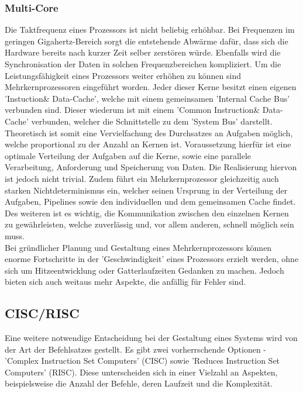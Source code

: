 \subsubsection{Multi-Core}
Die Taktfrequenz eines Prozessors ist nicht beliebig erhöhbar. Bei Frequenzen im geringen Gigahertz-Bereich sorgt die entstehende Abwärme dafür, dass sich die Hardware bereits nach kurzer Zeit selber zerstören würde. Ebenfalls wird die Synchronisation der Daten in solchen Frequenzbereichen kompliziert. Um die Leistungsfähigkeit eines Prozessors weiter erhöhen zu können sind Mehrkernprozessoren eingeführt worden. Jeder dieser Kerne besitzt einen eigenen 'Instuction\& Data-Cache', welche mit einem gemeinsamen 'Internal Cache Bus' verbunden sind. Dieser wiederum ist mit einem 'Common Instruction\& Data-Cache' verbunden, welcher die Schnittstelle zu dem 'System Bus' darstellt.\\
Theoretisch ist somit eine Vervielfachung des Durchsatzes an Aufgaben möglich, welche proportional zu der Anzahl an Kernen ist. Voraussetzung hierfür ist eine optimale Verteilung der Aufgaben auf die Kerne, sowie eine parallele Verarbeitung, Anforderung und Speicherung von Daten. Die Realisierung hiervon ist jedoch nicht trivial. Zudem führt ein Mehrkernprozessor gleichzeitig auch starken Nichtdeterminismus ein, welcher seinen Ursprung in der Verteilung der Aufgaben, Pipelines sowie den individuellen und dem gemeinsamen Cache findet. Des weiteren ist es wichtig, die Kommunikation zwischen den einzelnen Kernen zu gewährleisten, welche zuverlässig und, vor allem anderen, schnell möglich sein muss.\\
Bei gründlicher Planung und Gestaltung eines Mehrkernprozessors können enorme Fortschritte in der 'Geschwindigkeit' eines Prozessors erzielt werden, ohne sich um Hitzeentwicklung oder Gatterlaufzeiten Gedanken zu machen. Jedoch bieten sich auch weitaus mehr Aspekte, die anfällig für Fehler sind.

\subsection{CISC/RISC}\label{2.5}
Eine weitere notwendige Entscheidung bei der Gestaltung eines Systems wird von der Art der Befehlsatzes gestellt. Es gibt zwei vorherrschende Optionen - 'Complex Instruction Set Computers' (CISC) sowie 'Reduces Instruction Set Computers' (RISC). Diese unterscheiden sich in einer Vielzahl an Aspekten, beispielsweise die Anzahl der Befehle, deren Laufzeit und die Komplexität.

